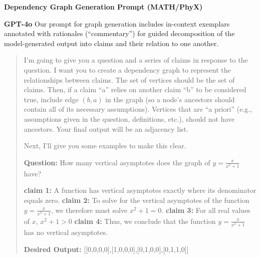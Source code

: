 \documentclass{uai2026} %
\theoremstyle{remark}
\theoremstyle{plain}
\theoremstyle{definition}
\begin{document}
\textbf{Dependency Graph Generation Prompt (MATH/PhyX)}

\textbf{GPT-4o} Our prompt for graph generation includes in-context exemplars annotated with rationales (``commentary'') for guided decomposition of the model-generated output into claims and their relation to one another.

\begin{quote}
I'm going to give you a question and a series of claims in response to the question. I want you to create a dependency graph to represent the relationships between claims. The set of vertices should be the set of claims. Then, if a claim ``a'' relies on another claim ``b'' to be considered true, include edge $(b, a)$ in the graph (so a node's ancestors should contain all of its necessary assumptions). Vertices that are ``a priori'' (e.g., assumptions given in the question, definitions, etc.), should not have ancestors. Your final output will be an adjacency list.

Next, I'll give you some examples to make this clear.

\textbf{Question:} How many vertical asymptotes does the graph of $y = \frac{x}{x^2+1}$ have?

\textbf{claim 1:} A function has vertical asymptotes exactly where its denominator equals zero. 
\textbf{claim 2:} To solve for the vertical asymptotes of the function $y = \frac{x}{x^2+1}$, we therefore must solve $x^2 + 1 = 0$. 
\textbf{claim 3:} For all real values of $x$, $x^2 + 1 > 0$ 
\textbf{claim 4:} Thus, we conclude that the function $y = \frac{x}{x^2+1}$ has no vertical asymptotes.

\textbf{Desired Output:} [[0,0,0,0],[1,0,0,0],[0,1,0,0],[0,1,1,0]]


\end{quote}
\end{document}
